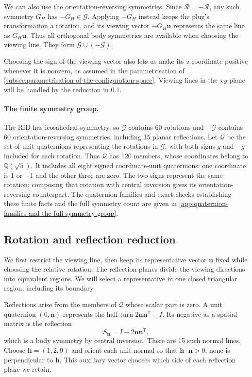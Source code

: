 We can also use the orientation-reversing symmetries. Since $\mathcal R=-\mathcal R$, any such
symmetry $G_{H}$ has $-G_{H}\in\mathcal G$.
Applying $-G_{H}$ instead keeps the plug's transformation a rotation, and its viewing
vector $-G_{H}\mathbf u$ represents the same line as $G_{H}\mathbf u$.
Thus all orthogonal body symmetries are available when choosing the
viewing line. They form $\mathcal G\cup(-\mathcal G)$.

Choosing the sign of the viewing vector also lets us make its $z$-coordinate
positive whenever it is nonzero, as assumed in the parametrisation of
\cref{subsec:parametrisation-of-the-configuration-space}. Viewing lines in
the $xy$-plane will be handled by the reduction in
\cref{subsec:rotation-and-reflection-reduction}.

\paragraph{The finite symmetry group.}
The RID has icosahedral symmetry, so $\mathcal G$ contains 60 rotations
and $-\mathcal G$ contains 60 orientation-reversing symmetries, including
15 planar reflections. Let $\mathcal Q$ be the set of unit quaternions representing
the rotations in $\mathcal G$, with both signs $g$ and $-g$ included for
each rotation. Thus $\mathcal Q$ has 120
members, whose coordinates belong to $\mathbb Q(\sqrt5)$. It includes all
eight signed coordinate-unit quaternions: one coordinate is $1$ or $-1$
and the other three are zero. The two signs represent the same rotation;
composing that rotation with central inversion gives its
orientation-reversing counterpart.
The quaternion families and exact checks establishing these finite facts
and the full symmetry count are given in
\cref{app:quaternion-families-and-the-full-symmetry-group}.

\subsection{Rotation and reflection reduction}\label{subsec:rotation-and-reflection-reduction}

We first restrict the viewing line, then keep its representative vector
$\mathbf u$ fixed while choosing the relative rotation. The reflection planes divide the viewing directions
into equivalent regions. We will select a representative in one closed
triangular region, including its boundary.

Reflections arise from the members of $\mathcal Q$ whose scalar part is zero. A unit quaternion
$(0,\mathbf n)$ represents the half-turn $2\mathbf n\mathbf n^{\mathsf T}-I$.
Its negative as a spatial matrix is the reflection
\[
  S_{\mathbf n}=I-2\mathbf n\mathbf n^{\mathsf T},
\]
which is a body symmetry by central inversion. There are 15 such normal
lines. Choose $\mathbf h=(1,2,9)$ and orient each unit normal so that
$\mathbf h\cdot\mathbf n>0$; none is perpendicular to $\mathbf h$.
This auxiliary vector chooses which side of each reflection plane we retain.

